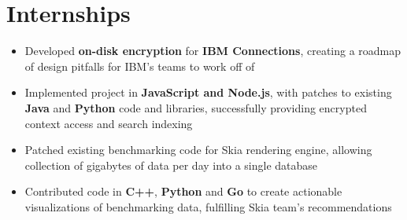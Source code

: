 \documentclass{my_resume}
\begin{document}
\section{Internships}
\begin{flushleft}
\begin{itemize}[noitemsep]
  \item Developed \textbf{on-disk encryption} for \textbf{IBM Connections}, creating a roadmap of design pitfalls for IBM's teams to work off of
  \item Implemented project in \textbf{JavaScript and Node.js}, with patches to existing \textbf{Java} and \textbf{Python} code and libraries, successfully providing encrypted context access and search indexing
\end{itemize}
\end{flushleft}
\begin{flushleft}
\begin{itemize}[noitemsep]
  \item Patched existing benchmarking code for Skia rendering engine, allowing collection of gigabytes of data per day into a single database
  \item Contributed code in \textbf{C++}, \textbf{Python} and \textbf{Go} to create actionable visualizations of benchmarking data, fulfilling Skia team's recommendations
\end{itemize}
\end{flushleft}
\end{document}
